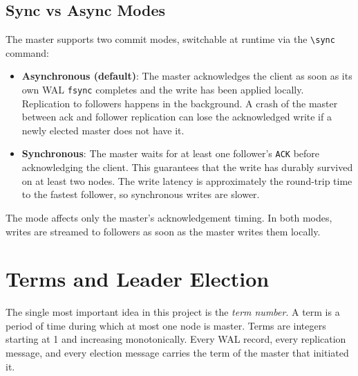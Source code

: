 \documentclass[11pt,a4paper]{article}
\begin{document}
\subsection{Sync vs Async Modes}
The master supports two commit modes, switchable at runtime via the \verb|\sync| command:

\begin{itemize}
\item \textbf{Asynchronous (default)}: The master acknowledges the client as soon as its own WAL \texttt{fsync} completes and the write has been applied locally. Replication to followers happens in the background. A crash of the master between ack and follower replication can lose the acknowledged write if a newly elected master does not have it.

\item \textbf{Synchronous}: The master waits for at least one follower's \texttt{ACK} before acknowledging the client. This guarantees that the write has durably survived on at least two nodes. The write latency is approximately the round-trip time to the fastest follower, so synchronous writes are slower.
\end{itemize}

The mode affects only the master's acknowledgement timing. In both modes, writes are streamed to followers as soon as the master writes them locally.

\section{Terms and Leader Election}

The single most important idea in this project is the \textit{term number}. A term is a period of time during which at most one node is master. Terms are integers starting at 1 and increasing monotonically. Every WAL record, every replication message, and every election message carries the term of the master that initiated it.
\end{document}
